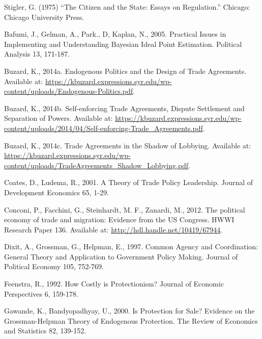 \documentclass[12pt]{article}
\begin{document}
\begin{list}{}{\setlength{\leftmargin}{0.3in}\setlength{\rightmargin}{0.0in}\setlength{\itemindent}{-0.3in}\setlength{\itemsep}{0.0in}}
\item Stigler, G. (1975) ``The Citizen and the State: Essays on Regulation.'' Chicago: Chicago University Press.



\item Bafumi, J., Gelman, A., Park., D, Kaplan, N., 2005. Practical Issues in Implementing and Understanding Bayesian Ideal Point Estimation. Political Analysis 13, 171-187.
	
	

	\item Buzard, K., 2014a. Endogenous Politics and the Design of Trade Agreements. Available at: \url{https://kbuzard.expressions.syr.edu/wp-content/uploads/Endogenous-Politics.pdf}.	
		
	\item Buzard, K., 2014b. Self-enforcing Trade Agreements, Dispute Settlement and Separation of Powers. Available at: \url{https://kbuzard.expressions.syr.edu/wp-content/uploads/2014/04/Self-enforcing-Trade_Agreements.pdf}.

\begin{sloppypar}	
	\item Buzard, K., 2014c. Trade Agreements in the Shadow of Lobbying. Available at: \url{https://kbuzard.expressions.syr.edu/wp-content/uploads/TradeAgreements_Shadow_Lobbying.pdf}.
		\end{sloppypar}
		

	\item Coates, D., Ludema, R., 2001. A Theory of Trade Policy Leadership. Journal of Development Economics 65, 1-29.
	
	\item Conconi, P., Facchini, G., Steinhardt, M. F., Zanardi, M., 2012. The political economy of trade and migration: Evidence from the US Congress. HWWI Research Paper 136. Available at: \url{http://hdl.handle.net/10419/67944}.
	
	\item Dixit, A., Grossman, G., Helpman, E., 1997. Common Agency and Coordination: General Theory and Application to Government Policy Making. Journal of Political Economy 105, 752-769.

	\item Feenstra, R., 1992. How Costly is Protectionism? Journal of Economic Perspectives 6, 159-178.

	\item Gawande, K., Bandyopadhyay, U., 2000. Is Protection for Sale? Evidence on the Grossman-Helpman Theory of Endogenous Protection. The Review of Economics and Statistics 82, 139-152.


\end{list}
\end{document}
